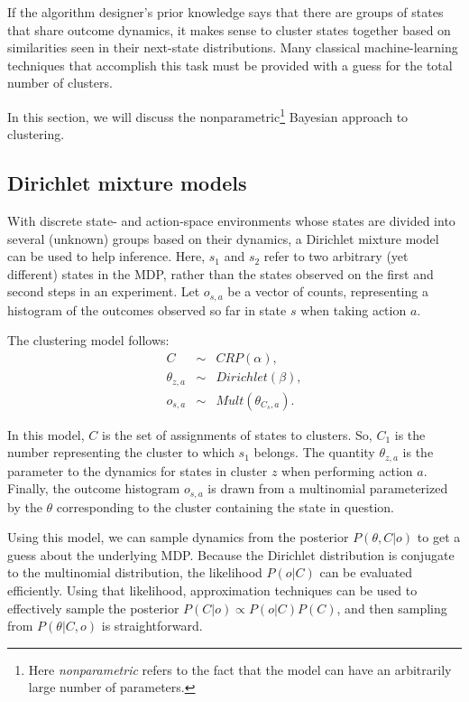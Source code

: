 If the algorithm designer's prior knowledge says that there are groups of states that share outcome dynamics, it makes sense to cluster states together based on similarities seen in their next-state distributions. Many classical machine-learning techniques that accomplish this task must be provided with a guess for the total number of clusters.

In this section, we will discuss the nonparametric\footnote{Here \emph{nonparametric} refers to the fact that the model can have an arbitrarily large number of parameters.} Bayesian approach to clustering.

\subsection{Dirichlet mixture models}

With discrete state- and action-space environments whose states are divided into several (unknown) groups based on their dynamics, a Dirichlet mixture model can be used to help inference. Here, $s_1$ and $s_2$ refer to two arbitrary (yet different) states in the MDP, rather than the states observed on the first and second steps in an experiment. Let $o_{s,a}$ be a vector of counts, representing a histogram of the outcomes observed so far in state $s$ when taking action $a$.

The clustering model follows:
\begin{eqnarray}
C &\sim& CRP(\alpha),\\
\theta_{z,a} &\sim& Dirichlet(\beta),\\
o_{s,a} &\sim& Mult(\theta_{C_s,a}).
\end{eqnarray}

In this model, $C$ is the set of assignments of states to clusters. So, $C_1$ is the number representing the cluster to which $s_1$ belongs. The quantity $\theta_{z,a}$ is the parameter to the dynamics for states in cluster $z$ when performing action $a$. Finally, the outcome histogram $o_{s,a}$ is drawn from a multinomial parameterized by the $\theta$ corresponding to the cluster containing the state in question.

Using this model, we can sample dynamics from the posterior $P(\theta, C|o)$ to get a guess about the underlying MDP. Because the Dirichlet distribution is conjugate to the multinomial distribution, the likelihood $P(o|C)$ can be evaluated efficiently. Using that likelihood, approximation techniques can be used to effectively sample the posterior $P(C|o)\propto P(o|C)P(C)$, and then sampling from $P(\theta|C,o)$ is straightforward.

